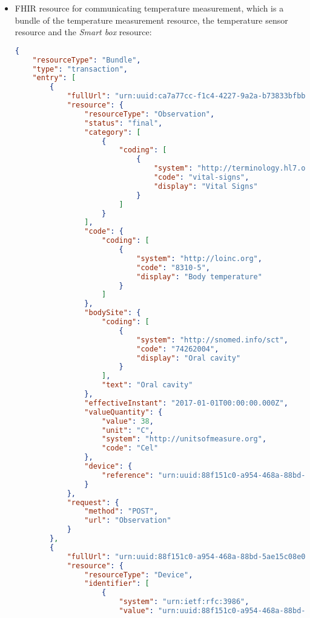 \begin{itemize}
    \item \acs{FHIR} resource for communicating temperature measurement, which is a bundle of the temperature measurement resource, the temperature sensor resource and the \textit{Smart box} resource:
    \begin{lstlisting}[language=json]   
{ 
    "resourceType": "Bundle", 
    "type": "transaction", 
    "entry": [ 
        { 
            "fullUrl": "urn:uuid:ca7a77cc-f1c4-4227-9a2a-b73833bfbb11",  
            "resource": { 
                "resourceType": "Observation", 
                "status": "final", 
                "category": [ 
                    { 
                        "coding": [ 
                            { 
                                "system": "http://terminology.hl7.org/CodeSystem/observation-category", 
                                "code": "vital-signs", 
                                "display": "Vital Signs" 
                            } 
                        ] 
                    } 
                ], 
                "code": { 
                    "coding": [ 
                        { 
                            "system": "http://loinc.org", 
                            "code": "8310-5", 
                            "display": "Body temperature" 
                        } 
                    ] 
                }, 
                "bodySite": { 
                    "coding": [ 
                        { 
                            "system": "http://snomed.info/sct", 
                            "code": "74262004", 
                            "display": "Oral cavity" 
                        } 
                    ], 
                    "text": "Oral cavity" 
                }, 
                "effectiveInstant": "2017-01-01T00:00:00.000Z", 
                "valueQuantity": { 
                    "value": 38, 
                    "unit": "C", 
                    "system": "http://unitsofmeasure.org", 
                    "code": "Cel" 
                }, 
                "device": { 
                    "reference": "urn:uuid:88f151c0-a954-468a-88bd-5ae15c08e059" 
                } 
            }, 
            "request": { 
                "method": "POST", 
                "url": "Observation" 
            } 
        }, 
        { 
            "fullUrl": "urn:uuid:88f151c0-a954-468a-88bd-5ae15c08e059",  
            "resource": { 
                "resourceType": "Device", 
                "identifier": [ 
                    { 
                        "system": "urn:ietf:rfc:3986", 
                        "value": "urn:uuid:88f151c0-a954-468a-88bd-5ae15c08e059"  

\end{lstlisting}
\end{itemize}
